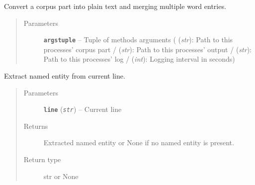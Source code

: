 \documentclass[letterpaper,10pt,english]{sphinxmanual}
\begin{document}

\begin{fulllineitems}
\label{src.prep.corpus:src.prep.corpus.convert_to_plain.convert_part_merging}
Convert a corpus part into plain text and merging multiple word entries.
\begin{quote}\begin{description}
\item[{Parameters}] \leavevmode
\textbf{\texttt{argstuple}} -- Tuple of methods arguments ( (\emph{str}): Path to this processes' corpus part / 
(\emph{str}): Path to this processes' output /  (\emph{str}): Path to this processes' log / 
(\emph{int}): Logging interval in seconds)

\end{description}\end{quote}

\end{fulllineitems}


\begin{fulllineitems}
\label{src.prep.corpus:src.prep.corpus.convert_to_plain.extract_named_entity}
Extract named entity from current line.
\begin{quote}\begin{description}
\item[{Parameters}] \leavevmode
\textbf{\texttt{line}} (\emph{\texttt{str}}) -- Current line

\item[{Returns}] \leavevmode
Extracted named entity or None if no named entity is present.

\item[{Return type}] \leavevmode
str or None

\end{description}\end{quote}

\end{fulllineitems}

\end{document}
